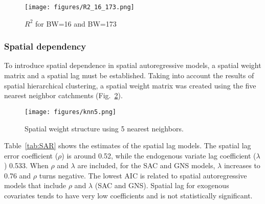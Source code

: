 \documentclass[
  manuscript=article,  
  layout=preprint,  
  year=2023,
  volume=0,
]{format}
\begin{document}
\begin{figure}[ht!]
    \centering
      {\texttt{[image: figures/R2\_16\_173.png]}}
    \caption{$R^2$ for BW=16 and BW=173}
    \label{fig:gwr}
\end{figure}

\subsubsection{Spatial dependency}
\par To introduce spatial dependence in spatial autoregressive models, a spatial weight matrix and a spatial lag must be established. Taking into account the results of spatial hierarchical clustering, a spatial weight matrix was created using the five nearest neighbor catchments (Fig.~\ref{fig:knn}). 

\begin{figure}[ht!]
    \centering
      {\texttt{[image: figures/knn5.png]}}
    \caption{Spatial weight structure using 5 nearest neighbors.}
    \label{fig:knn}
\end{figure}

Table~\ref{tab:SAR} shows the estimates of the spatial lag models. The spatial lag error coefficient ($\rho$) is around 0.52, while the endogenous variate lag coefficient ($\lambda$)  0.533. When $\rho$ and $\lambda$ are included, for the SAC and GNS models, $\lambda$ increases to 0.76 and $\rho$ turns negative. The lowest AIC is related to spatial autoregressive models that include $\rho$ and $\lambda$ (SAC and GNS). Spatial lag for exogenous covariates tends to have very low coefficients and is not statistically significant.
\end{document}
